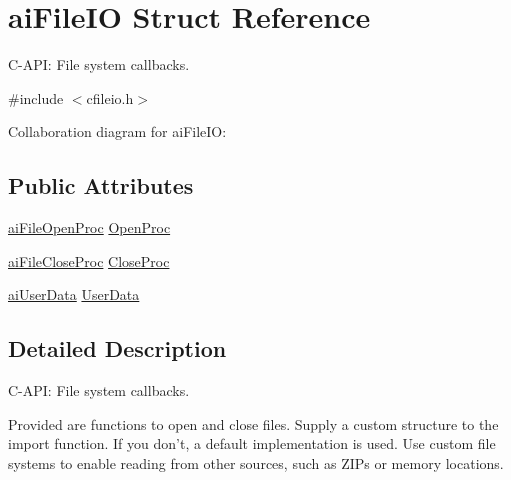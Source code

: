 \hypertarget{structai_file_i_o}{\section{ai\-File\-I\-O Struct Reference}
\label{structai_file_i_o}
}


C-\/\-A\-P\-I\-: File system callbacks.  




{\ttfamily \#include $<$cfileio.\-h$>$}



Collaboration diagram for ai\-File\-I\-O\-:
\subsection*{Public Attributes}
\begin{DoxyCompactItemize}
\item 
\hyperlink{cfileio_8h_aa2746201910ae213e98ef82d4f313d66}{ai\-File\-Open\-Proc} \hyperlink{structai_file_i_o_a819d9c7823039294125068d06949a6df}{Open\-Proc}
\item 
\hyperlink{cfileio_8h_a32e3d4bf95dfb921a263a4aa77105c0f}{ai\-File\-Close\-Proc} \hyperlink{structai_file_i_o_a7ec702672712b5a02dc49cb17f980a14}{Close\-Proc}
\item 
\hyperlink{cfileio_8h_a176132d0cd51c96302089ff3f8a8ee1c}{ai\-User\-Data} \hyperlink{structai_file_i_o_a9c62b7f3d70fbb2f41e33ad0b9933139}{User\-Data}
\end{DoxyCompactItemize}


\subsection{Detailed Description}
C-\/\-A\-P\-I\-: File system callbacks. 

Provided are functions to open and close files. Supply a custom structure to the import function. If you don't, a default implementation is used. Use custom file systems to enable reading from other sources, such as Z\-I\-Ps or memory locations. 

